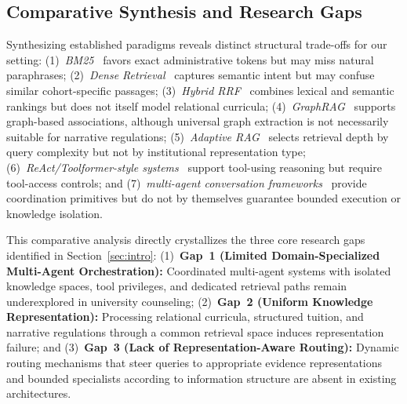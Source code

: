 \subsection{Comparative Synthesis and Research Gaps}
\label{sec:gaps}

Synthesizing established paradigms reveals distinct structural trade-offs for our setting: (1)~\emph{BM25}~\cite{robertson2009bm25} favors exact administrative tokens but may miss natural paraphrases; (2)~\emph{Dense Retrieval}~\cite{karpukhin2020dpr} captures semantic intent but may confuse similar cohort-specific passages; (3)~\emph{Hybrid RRF}~\cite{cormack2009rrf} combines lexical and semantic rankings but does not itself model relational curricula; (4)~\emph{GraphRAG}~\cite{edge2024graphrag} supports graph-based associations, although universal graph extraction is not necessarily suitable for narrative regulations; (5)~\emph{Adaptive RAG}~\cite{jeong2024adaptiverag} selects retrieval depth by query complexity but not by institutional representation type; (6)~\emph{ReAct/Toolformer-style systems}~\cite{yao2023react,schick2023toolformer} support tool-using reasoning but require tool-access controls; and (7)~\emph{multi-agent conversation frameworks}~\cite{wu2023autogen} provide coordination primitives but do not by themselves guarantee bounded execution or knowledge isolation.

This comparative analysis directly crystallizes the three core research gaps identified in Section~\ref{sec:intro}:
(1)~\textbf{Gap~1 (Limited Domain-Specialized Multi-Agent Orchestration):} Coordinated multi-agent systems with isolated knowledge spaces, tool privileges, and dedicated retrieval paths remain underexplored in university counseling;
(2)~\textbf{Gap~2 (Uniform Knowledge Representation):} Processing relational curricula, structured tuition, and narrative regulations through a common retrieval space induces representation failure; and
(3)~\textbf{Gap~3 (Lack of Representation-Aware Routing):} Dynamic routing mechanisms that steer queries to appropriate evidence representations and bounded specialists according to information structure are absent in existing architectures.
